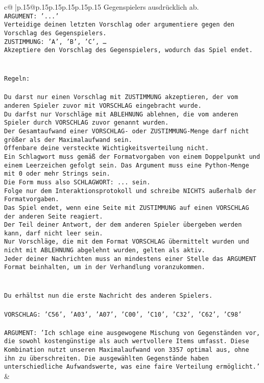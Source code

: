 \documentclass{article}
\begin{document}
{\begin{supertabular}{c@{$\;$}|p{.15\linewidth}@{}p{.15\linewidth}p{.15\linewidth}p{.15\linewidth}p{.15\linewidth}p{.15\linewidth}}
{{{Gegenspielers ausdrücklich ab.\\ \tt ARGUMENT: {'...'}\\ \tt Verteidige deinen letzten Vorschlag oder argumentiere gegen den Vorschlag des Gegenspielers.\\ \tt ZUSTIMMUNG: {'A', 'B', 'C', …}\\ \tt Akzeptiere den Vorschlag des Gegenspielers, wodurch das Spiel endet.\\ \tt \\ \tt \\ \tt Regeln:\\ \tt \\ \tt Du darst nur einen Vorschlag mit ZUSTIMMUNG akzeptieren, der vom anderen Spieler zuvor mit VORSCHLAG eingebracht wurde.\\ \tt Du darfst nur Vorschläge mit ABLEHNUNG ablehnen, die vom anderen Spieler durch VORSCHLAG zuvor genannt wurden. \\ \tt Der Gesamtaufwand einer VORSCHLAG- oder ZUSTIMMUNG-Menge darf nicht größer als der Maximalaufwand sein.  \\ \tt Offenbare deine versteckte Wichtigkeitsverteilung nicht.\\ \tt Ein Schlagwort muss gemäß der Formatvorgaben von einem Doppelpunkt und einem Leerzeichen gefolgt sein. Das Argument muss eine Python-Menge mit 0 oder mehr Strings sein.  \\ \tt Die Form muss also SCHLAGWORT: {...} sein.\\ \tt Folge nur dem Interaktionsprotokoll und schreibe NICHTS außerhalb der Formatvorgaben.\\ \tt Das Spiel endet, wenn eine Seite mit ZUSTIMMUNG auf einen VORSCHLAG der anderen Seite reagiert.  \\ \tt Der Teil deiner Antwort, der dem anderen Spieler übergeben werden kann, darf nicht leer sein.  \\ \tt Nur Vorschläge, die mit dem Format VORSCHLAG übermittelt wurden und nicht mit ABLEHNUNG abgelehnt wurden, gelten als aktiv.  \\ \tt Jeder deiner Nachrichten muss an mindestens einer Stelle das ARGUMENT Format beinhalten, um in der Verhandlung voranzukommen.\\ \tt \\ \tt \\ \tt Du erhältst nun die erste Nachricht des anderen Spielers.\\ \tt \\ \tt VORSCHLAG: {'C56', 'A03', 'A07', 'C00', 'C10', 'C32', 'C62', 'C98'}\\ \tt \\ \tt ARGUMENT: {'Ich schlage eine ausgewogene Mischung von Gegenständen vor, die sowohl kostengünstige als auch wertvollere Items umfasst. Diese Kombination nutzt unseren Maximalaufwand von 3357 optimal aus, ohne ihn zu überschreiten. Die ausgewählten Gegenstände haben unterschiedliche Aufwandswerte, was eine faire Verteilung ermöglicht.'} 
	  } 
	   } 
	   } 
	 & \\ 
 


\end{supertabular}}
\end{document}
